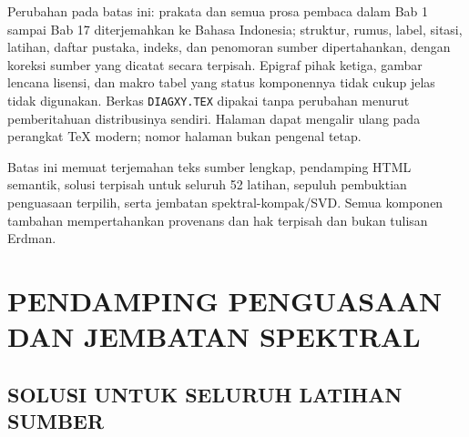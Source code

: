 \documentclass[11pt,reqno]{amsbook}
\theoremstyle{definition}
\theoremstyle{remark}
\numberwithin{equation}{section}
\begin{document}
Perubahan pada batas ini: prakata dan semua prosa pembaca dalam Bab 1 sampai
Bab 17 diterjemahkan ke Bahasa Indonesia; struktur, rumus, label, sitasi,
latihan, daftar pustaka, indeks, dan penomoran sumber dipertahankan, dengan
koreksi sumber yang dicatat secara terpisah. Epigraf pihak ketiga, gambar lencana lisensi, dan makro tabel yang
status komponennya tidak cukup jelas tidak digunakan. Berkas
\texttt{DIAGXY.TEX} dipakai tanpa perubahan menurut pemberitahuan distribusinya
sendiri. Halaman dapat
mengalir ulang pada perangkat TeX modern; nomor halaman bukan pengenal tetap.

Batas ini memuat terjemahan teks sumber lengkap, pendamping HTML semantik,
solusi terpisah untuk seluruh 52 latihan, sepuluh pembuktian penguasaan
terpilih, serta jembatan spektral-kompak/SVD. Semua komponen tambahan
mempertahankan provenans dan hak terpisah dan bukan tulisan Erdman.


\vfill\eject

\tableofcontents


 

 \cleardoublepage


\mainmatter




 
 
 
 
 
 
 
 
 
 
 
 
 
 
 
 
 








\part{PENDAMPING PENGUASAAN DAN JEMBATAN SPEKTRAL}





\chapter{SOLUSI UNTUK SELURUH LATIHAN SUMBER}
\end{document}
